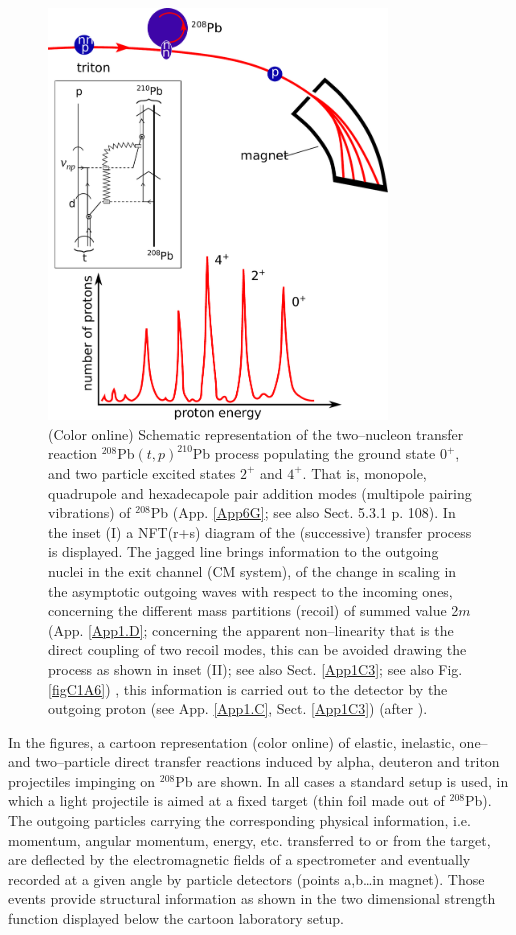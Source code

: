 \begin{figure}
\centerline {
\includegraphics*[width=9cm]{introduccion/figs/figintro3}
}
\caption{(Color online) Schematic representation of the two--nucleon transfer reaction $^{208}$Pb$(t,p)^{210}$Pb process populating the ground state $0^+$, and two particle excited states $2^+$ and $4^+$.  That is, monopole, quadrupole and hexadecapole pair addition modes (multipole pairing vibrations) of $^{208}$Pb   (App. \ref{App6G}; see also \cite{Brink:05} Sect. 5.3.1 p. 108). In the inset (I) a NFT(r+s) diagram of the (successive) transfer process is displayed. The jagged line brings information to the outgoing nuclei in the exit channel (CM system), of the change in scaling in the asymptotic outgoing waves with respect to the incoming ones, concerning the different mass partitions (recoil) of summed value 2$m$ (App. \ref{App1.D}; concerning the apparent non--linearity that is the direct coupling of two recoil modes, this can be avoided drawing the process as shown in inset (II); see also Sect. \ref{App1C3}; see also Fig. \ref{figC1A6}) , this information is carried out to the detector by the outgoing proton (see App. \ref{App1.C}, Sect. \ref{App1C3}) (after \cite{Mottelson:76b}).}
\label{figintro3}
\end{figure}

In the figures, a cartoon representation (color online) of elastic, inelastic, one-- and two--particle direct transfer reactions induced by alpha, deuteron and triton  projectiles impinging on $^{208}$Pb are shown. In all cases a standard setup is used, in which a light projectile is aimed at a fixed target (thin foil made out of $^{208}$Pb). The outgoing particles carrying the corresponding physical information, i.e. momentum, angular momentum, energy, etc. transferred to or from the target, are deflected by the electromagnetic fields of a spectrometer and eventually recorded at a given angle by particle detectors (points a,b\dots in magnet). Those events provide structural information as shown in the two dimensional strength function displayed below the cartoon laboratory setup. 


